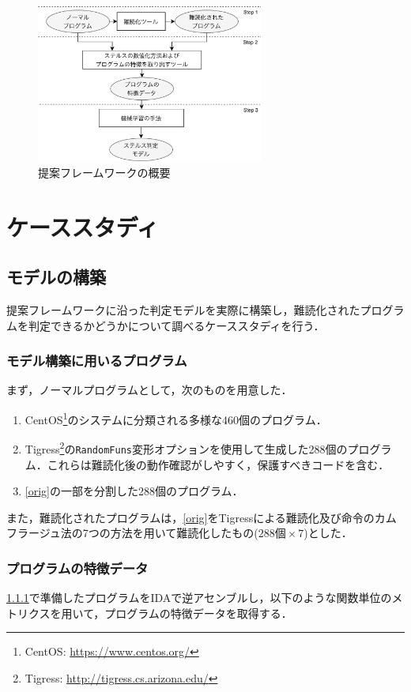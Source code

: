 \documentclass[twocolumn,11pt]{jsarticle}
\begin{document}
\begin{figure}[!t]
 \centering
 \includegraphics[width=7.5cm]{framework.pdf}
 \caption{提案フレームワークの概要}
 \label{fig:framework}
\end{figure}

\section{ケーススタディ}
\subsection{モデルの構築}
提案フレームワークに沿った判定モデルを実際に構築し，難読化されたプログラムを判定できるかどうかについて調べるケーススタディを行う．

\def\thesubsubsection{(Step \arabic{subsubsection})}
\subsubsection{モデル構築に用いるプログラム} \label{data}
まず，ノーマルプログラムとして，次のものを用意した．

\begin{enumerate}[label={(\arabic*)}]
  \item CentOS\footnote{CentOS: \url{https://www.centos.org/}}のシステムに分類される多様な460個のプログラム．
  \item Tigress\footnote{Tigress: \url{http://tigress.cs.arizona.edu/}}の\texttt{RandomFuns}変形オプションを使用して生成した288個のプログラム．これらは難読化後の動作確認がしやすく，保護すべきコードを含む．\label{orig} 
  \item \ref{orig}の一部を分割した288個のプログラム．
\end{enumerate}

また，難読化されたプログラムは，\ref{orig}をTigressによる難読化及び命令のカムフラージュ法の7つの方法を用いて難読化したもの($288個\times7$)とした．

\subsubsection{プログラムの特徴データ} \label{metrics}
\ref{data}で準備したプログラムをIDAで逆アセンブルし，以下のような関数単位のメトリクスを用いて，プログラムの特徴データを取得する．
\end{document}
